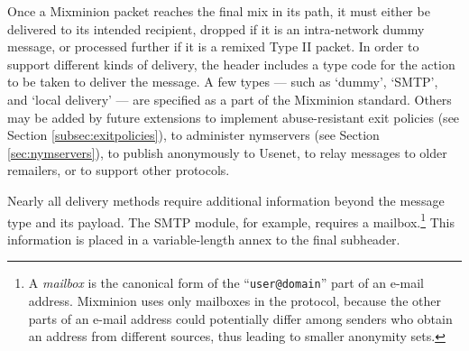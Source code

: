 \documentclass[final]{ieee}
\begin{document}

Once a Mixminion packet reaches the final mix in its path, it must
either be delivered to its intended recipient, dropped if it is an
intra-network dummy message, or processed further if it is a remixed
Type II packet. In order to support different kinds of
delivery, the header includes a type code for the action to be taken
to deliver the message.  A few types --- such as `dummy', `SMTP', and
`local delivery' --- are specified as a part of the Mixminion
standard.  Others may be added by future extensions to
implement abuse-resistant exit policies (see Section
\ref{subsec:exitpolicies}), to administer nymservers (see Section
\ref{sec:nymservers}), to publish anonymously to Usenet, to relay
messages to older remailers, or to support other protocols.  

Nearly all delivery methods require additional information beyond the
message type and its payload.  The SMTP module, for example, requires
a mailbox.\footnote{A {\it mailbox} is the canonical form of the
``{\tt user@domain}'' part of an e-mail address. Mixminion uses only
mailboxes in the protocol, because the other parts
of an e-mail address could potentially differ among senders who
obtain an address from different sources, thus leading to smaller
anonymity sets.}
This information is placed
in a variable-length annex to the final subheader.

%
%
\end{document}
